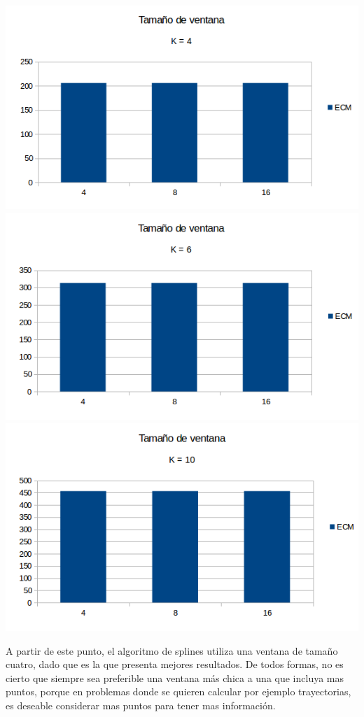 \begin{center}
\includegraphics[scale=0.50]{imagenes/VK4.png}
\includegraphics[scale=0.50]{imagenes/VK6.png}
\includegraphics[scale=0.50]{imagenes/VK10.png}
\end{center}

A partir de este punto, el algoritmo de splines utiliza una ventana de tamaño cuatro, dado que es la que presenta mejores resultados.
De todos formas, no es cierto que siempre sea preferible una ventana más chica a una que incluya mas puntos, porque en problemas donde se quieren calcular por ejemplo trayectorias, es deseable considerar mas puntos para tener mas información.

